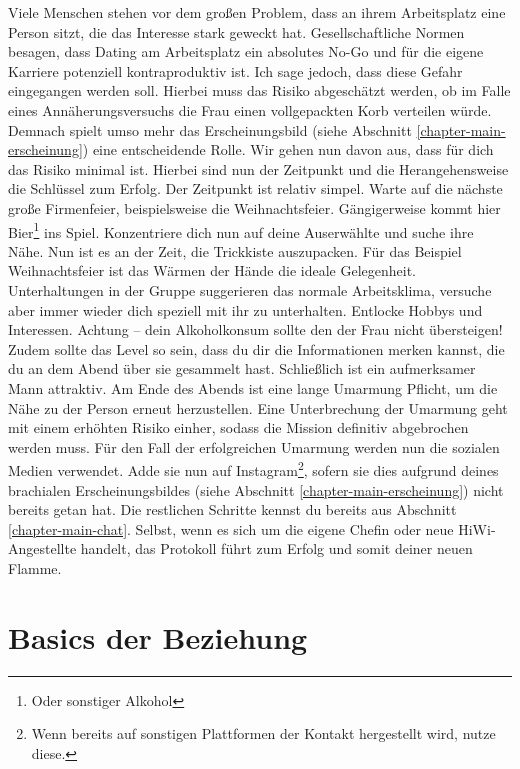 Viele Menschen stehen vor dem großen Problem, dass an ihrem Arbeitsplatz eine Person sitzt, die das Interesse stark geweckt hat.
Gesellschaftliche Normen besagen, dass Dating am Arbeitsplatz ein absolutes No-Go und für die eigene Karriere potenziell kontraproduktiv ist.
Ich sage jedoch, dass diese Gefahr eingegangen werden soll.
Hierbei muss das Risiko abgeschätzt werden, ob im Falle eines Annäherungsversuchs die Frau einen vollgepackten Korb verteilen würde.
Demnach spielt umso mehr das Erscheinungsbild (siehe Abschnitt \ref{chapter-main-erscheinung}) eine entscheidende Rolle.
Wir gehen nun davon aus, dass für dich das Risiko minimal ist.
Hierbei sind nun der Zeitpunkt und die Herangehensweise die Schlüssel zum Erfolg.
Der Zeitpunkt ist relativ simpel.
Warte auf die nächste große Firmenfeier, beispielsweise die Weihnachtsfeier.
Gängigerweise kommt hier Bier\footnote{Oder sonstiger Alkohol} ins Spiel.
Konzentriere dich nun auf deine Auserwählte und suche ihre Nähe. 
Nun ist es an der Zeit, die Trickkiste auszupacken.
Für das Beispiel Weihnachtsfeier ist das Wärmen der Hände die ideale Gelegenheit.
Unterhaltungen in der Gruppe suggerieren das normale Arbeitsklima, versuche aber immer wieder dich speziell mit ihr zu unterhalten.
Entlocke Hobbys und Interessen.
Achtung – dein Alkoholkonsum sollte den der Frau nicht übersteigen!
Zudem sollte das Level so sein, dass du dir die Informationen merken kannst, die du an dem Abend über sie gesammelt hast. 
Schließlich ist ein aufmerksamer Mann attraktiv.
Am Ende des Abends ist eine lange Umarmung Pflicht, um die Nähe zu der Person erneut herzustellen.
Eine Unterbrechung der Umarmung geht mit einem erhöhten Risiko einher, sodass die Mission definitiv abgebrochen werden muss.
Für den Fall der erfolgreichen Umarmung werden nun die sozialen Medien verwendet.
Adde sie nun auf Instagram\footnote{Wenn bereits auf sonstigen Plattformen der Kontakt hergestellt wird, nutze diese.}, sofern sie dies aufgrund deines brachialen Erscheinungsbildes (siehe Abschnitt \ref{chapter-main-erscheinung}) nicht bereits getan hat.
Die restlichen Schritte kennst du bereits aus Abschnitt \ref{chapter-main-chat}.
Selbst, wenn es sich um die eigene Chefin oder neue HiWi-Angestellte handelt, das Protokoll führt zum Erfolg und somit deiner neuen Flamme.


\section{Basics der Beziehung}
\label{chapter-main-weisheit}

